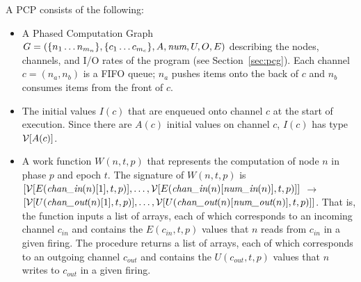 \noindent A PCP consists of the following:
\begin{itemize}

\item A Phased Computation Graph $G = (\{n_1 \dots n_{m_n}\}, \{c_1
\dots c_{m_c}\}, A, \mbox{\it num}, U, O, E)$ describing the nodes,
channels, and I/O rates of the program (see Section~\ref{sec:pcg}).
Each channel $c = (n_a, n_b)$ is a FIFO queue; $n_a$ pushes items onto
the back of $c$ and $n_b$ consumes items from the front of $c$.

\item The initial values $I(c)$ that are enqueued onto channel $c$ at
the start of execution.  Since there are $A(c)$ initial values on
channel $c$, $I(c)$ has type ${\cal V}[A(c)]$.

%
\item A work function $W(n, t, p)$ that represents the computation of
node $n$ in phase $p$ and epoch $t$.  The signature of $W(n, t, p)$ is
$[{\cal V}[E(\mbox{\it chan\_in}(n)[1], t, p)], \dots, {\cal
V}[E(\mbox{\it chan\_in}(n)[\mbox{\it num\_in}(n)], t, p)]]$ $\rightarrow$ \\ $[
{\cal V}[U(\mbox{\it chan\_out}(n)[1], t, p)], \dots, {\cal
V}[U(\mbox{\it chan\_out}(n)[\mbox{\it num\_out}(n)], t, p)]]$.  That is, the
function inputs a list of arrays, each of which corresponds to an
incoming channel $c_{in}$ and contains the $E(c_{in},t,p)$ values that
$n$ reads from $c_{in}$ in a given firing.  The procedure returns a
list of arrays, each of which corresponds to an outgoing channel
$c_{out}$ and contains the $U(c_{out},t,p)$ values that $n$ writes to
$c_{out}$ in a given firing.

\end{itemize}


